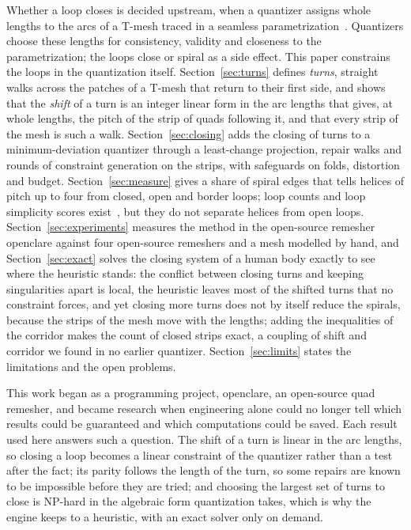 \documentclass[11pt,a4paper]{article}
\begin{document}
Whether a loop closes is decided upstream, when a quantizer assigns whole
lengths to the arcs of a T-mesh traced in a seamless
parametrization~\cite{campen2015qgp,lyon2021constrained,heistermann2023bimdf}.
Quantizers choose these lengths for consistency, validity and closeness to
the parametrization; the loops close or spiral as a side effect. This paper
constrains the loops in the quantization itself. Section~\ref{sec:turns}
defines \emph{turns}, straight walks across the patches of a T-mesh that
return to their first side, and shows that the \emph{shift} of a turn is an
integer linear form in the arc lengths that gives, at whole lengths, the
pitch of the strip of quads following it, and that every strip of the mesh
is such a walk. Section~\ref{sec:closing} adds the closing of turns to a
minimum-deviation quantizer through a least-change projection, repair walks
and rounds of constraint generation on the strips, with safeguards on folds,
distortion and budget. Section~\ref{sec:measure} gives a share of spiral
edges that tells helices of pitch up to four from closed, open and border
loops; loop counts and loop simplicity scores
exist~\cite{liu2025quadgpt,kong2026squadgen}, but they do not separate
helices from open loops. Section~\ref{sec:experiments} measures the method in
the open-source remesher openclare against four open-source remeshers and a
mesh modelled by hand, and Section~\ref{sec:exact} solves the closing system
of a human body exactly to see where the heuristic stands: the conflict
between closing turns and keeping singularities apart is local, the
heuristic leaves most of the shifted turns that no constraint forces, and
yet closing more turns does not by itself reduce the spirals, because the
strips of the mesh move with the lengths; adding the inequalities of the
corridor makes the count of closed strips exact, a coupling of shift and
corridor we found in no earlier quantizer. Section~\ref{sec:limits} states
the limitations and the open problems.

This work began as a programming project, openclare, an open-source quad
remesher, and became research when engineering alone could no longer tell
which results could be guaranteed and which computations could be saved.
Each result used here answers such a question. The shift of a turn is linear
in the arc lengths, so closing a loop becomes a linear constraint of the
quantizer rather than a test after the fact; its parity follows the length
of the turn, so some repairs are known to be impossible before they are
tried; and choosing the largest set of turns to close is NP-hard in the
algebraic form quantization takes, which is why the engine keeps to a heuristic, with an exact solver only on demand.
\end{document}
